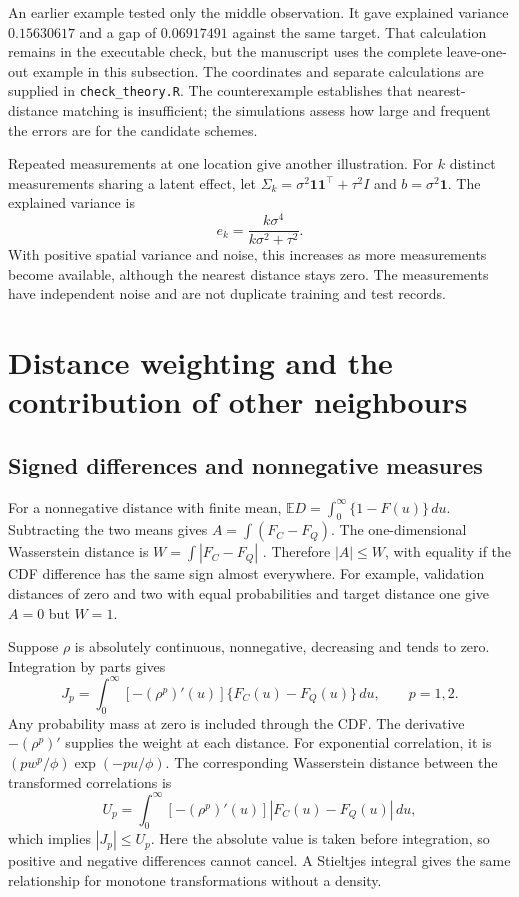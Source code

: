 \documentclass[11pt,a4paper]{article}
\newcommand{\E}{\mathbb{E}}
\begin{document}
An earlier example tested only the middle observation. It gave explained variance $0.15630617$ and a gap of $0.06917491$ against the same target. That calculation remains in the executable check, but the manuscript uses the complete leave-one-out example in this subsection. The coordinates and separate calculations are supplied in \texttt{check\_theory.R}. The counterexample establishes that nearest-distance matching is insufficient; the simulations assess how large and frequent the errors are for the candidate schemes.

Repeated measurements at one location give another illustration. For $k$ distinct measurements sharing a latent effect, let $\Sigma_k=\sigma^2\mathbf1\mathbf1^\top+\tau^2I$ and $b=\sigma^2\mathbf1$. The explained variance is
\[
e_k=\frac{k\sigma^4}{k\sigma^2+\tau^2}.
\]
With positive spatial variance and noise, this increases as more measurements become available, although the nearest distance stays zero. The measurements have independent noise and are not duplicate training and test records.

\section{Distance weighting and the contribution of other neighbours}
\label{sec:weighting}
\subsection{Signed differences and nonnegative measures}
\label{sec:transport}
For a nonnegative distance with finite mean, $\E D=\int_0^\infty\{1-F(u)\}\,du$. Subtracting the two means gives $A=\int(F_C-F_Q)$. The one-dimensional Wasserstein distance is $W=\int|F_C-F_Q|$ \citep{panaretos2019wasserstein}. Therefore $|A|\leq W$, with equality if the CDF difference has the same sign almost everywhere. For example, validation distances of zero and two with equal probabilities and target distance one give $A=0$ but $W=1$.

Suppose $\rho$ is absolutely continuous, nonnegative, decreasing and tends to zero. Integration by parts gives
\[
J_p=\int_0^\infty[-(\rho^p)'(u)]\{F_C(u)-F_Q(u)\}\,du,\qquad p=1,2.
\]
Any probability mass at zero is included through the CDF. The derivative $-(\rho^p)'$ supplies the weight at each distance. For exponential correlation, it is $(pw^p/\phi)\exp(-pu/\phi)$. The corresponding Wasserstein distance between the transformed correlations is
\[
U_p=\int_0^\infty[-(\rho^p)'(u)]|F_C(u)-F_Q(u)|\,du,
\]
which implies $|J_p|\leq U_p$. Here the absolute value is taken before integration, so positive and negative differences cannot cancel. A Stieltjes integral gives the same relationship for monotone transformations without a density.
\end{document}
